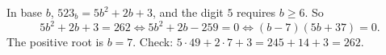 In base $b$, $523_b=5b^2+2b+3$, and the digit $5$ requires $b\ge6$. So
\[
5b^2+2b+3=262\iff 5b^2+2b-259=0\iff (b-7)(5b+37)=0 .
\]
The positive root is $b=\boxed{7}$. Check: $5\cdot49+2\cdot7+3=245+14+3=262$.
